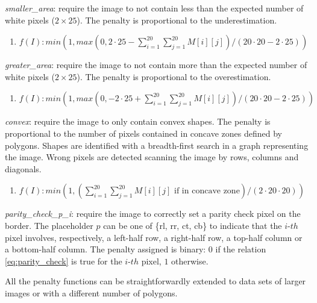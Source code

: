 \begin{description}
\item \textit{smaller\_area}: require the image to not contain less than the expected number of white pixels ($2\times25$). The penalty is proportional to the underestimation.
\begin{enumerate}
\item[] $f(I): min(1, max(0, 2\cdot25 - \sum\limits_{i=1}^{20} \sum\limits_{j=1}^{20} M[i][j]) / (20\cdot20 - 2\cdot25))$
\end{enumerate}

\item \textit{greater\_area}: require the image to not contain more than the expected number of white pixels ($2\times25$). The penalty is proportional to the overestimation.
\begin{enumerate}
\item[] $f(I): min(1, max(0, - 2\cdot25 + \sum\limits_{i=1}^{20} \sum\limits_{j=1}^{20} M[i][j]) / (20\cdot20 - 2\cdot25))$
\end{enumerate}

\item \textit{convex}: require the image to only contain convex shapes. The penalty is proportional to the number of pixels contained in concave zones defined by polygons. Shapes are identified with a breadth-first search in a graph representing the image. Wrong pixels are detected scanning the image by rows, columns and diagonals.
\begin{enumerate}
\item[] $f(I): min(1, (\sum\limits_{i=1}^{20} \sum\limits_{j=1}^{20} M[i][j] \text{ if in concave zone}) / (2\cdot20\cdot20))$
\end{enumerate}

\item \textit{parity\_check\_p\_i}: require the image to correctly set a parity check pixel on the border. The placeholder $p$ can be one of \{rl, rr, ct, cb\} to indicate that the $i\text{-}th$ pixel involves, respectively, a left-half row, a right-half row, a top-half column or a bottom-half column. The penalty assigned is binary: $0$ if the relation \ref{eq:parity_check} is true for the $i\text{-}th$ pixel, $1$ otherwise.

\end{description}


All the penalty functions can be straightforwardly extended to data sets of larger images or with a different number of polygons.

